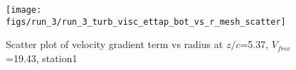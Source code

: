 \begin{figure}[H]
\centering
\texttt{[image: figs/run\_3/run\_3\_turb\_visc\_ettap\_bot\_vs\_r\_mesh\_scatter]}
\caption{Scatter plot of velocity gradient term vs radius at $z/c$=5.37, $V_{free}$=19.43, station1}
\label{fig:run_3_turb_visc_ettap_bot_vs_r_mesh_scatter}
\end{figure}


